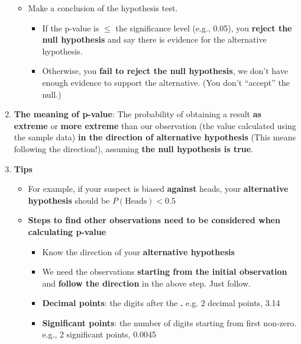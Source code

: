 \documentclass[10pt, landscape]{article}
\begin{document}
\begin{multicols}{4}
\begin{enumerate}
\begin{itemize}
        \item Make a conclusion of the hypothesis test.
        \begin{itemize}
            \item If the p-value is $\leq$ the significance level (e.g., 0.05), you \textbf{reject the null hypothesis} and say there is evidence for the alternative hypothesis.
            \item Otherwise, you \textbf{fail to reject the null hypothesis}, we don’t have enough evidence to support the alternative. (You don’t “accept” the null.)
        \end{itemize}
    \end{itemize}
    \item \textbf{The meaning of p-value}: The probability of obtaining a result \textbf{as extreme} or \textbf{more extreme} than our observation (the value calculated using the sample data) \textbf{in the direction of alternative hypothesis} (This means following the direction!), assuming \textbf{the null hypothesis is true}.
    \item \textbf{Tips}
    \begin{itemize}
        \item For example, if your suspect is biased \textbf{against} heads, your \textbf{alternative hypothesis} should be $P(\text{Heads})<0.5$
        \item \textbf{Steps to find other observations need to be considered when calculating p-value}
        \begin{itemize}
            \item Know the direction of your \textbf{alternative hypothesis}
            \item We need the observations \textbf{starting from the initial observation} and \textbf{follow the direction} in the above step. Just follow.
            \item \textbf{Decimal points}: the digits after the \textbf{.} e.g. 2 decimal points, 3.14
            \item \textbf{Significant points}: the number of digits starting from first non-zero. e.g., 2 significant points, 0.0045
        \end{itemize}
    \end{itemize}
\end{enumerate}

\end{multicols}
\end{document}
